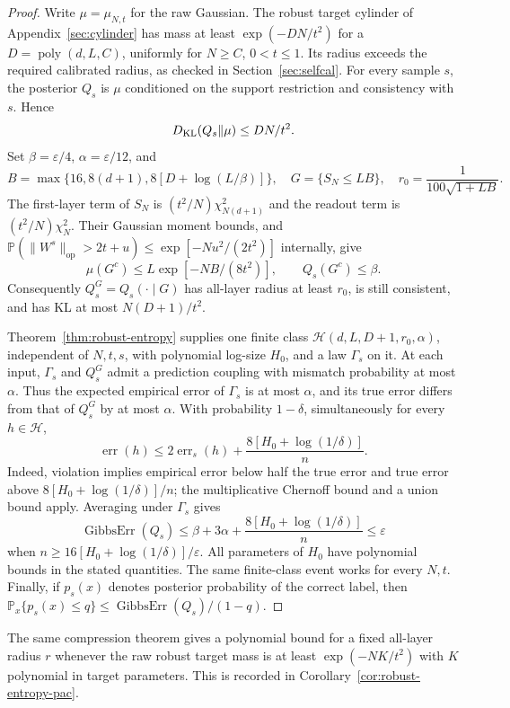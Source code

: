 \documentclass[11pt]{article}
\newcommand{\Pp}{\mathbb P}
\newcommand{\op}{\mathrm{op}}
\newcommand{\poly}{\operatorname{poly}}
\begin{document}
\begin{proof}
Write $\mu=\mu_{N,t}$ for the raw Gaussian. The robust target cylinder of
Appendix~\ref{sec:cylinder} has mass at least $\exp(-DN/t^2)$ for a
$D=\poly(d,L,C)$, uniformly for $N\ge C$, $0<t\le1$. Its radius exceeds
the required calibrated radius, as checked in Section~\ref{sec:selfcal}.
For every sample $s$, the posterior $Q_s$ is $\mu$ conditioned on the support
restriction and consistency with $s$. Hence
\[
 D_{\rm KL}(Q_s\Vert\mu)\le DN/t^2.
\]
Set $\beta=\varepsilon/4$, $\alpha=\varepsilon/12$, and
\[
 B=\max\{16,8(d+1),8[D+\log(L/\beta)]\},\quad
 G=\{S_N\le LB\},\quad r_0=\frac{1}{100\sqrt{1+LB}}.
\]
The first-layer term of $S_N$ is $(t^2/N)\chi^2_{N(d+1)}$ and the readout
term is $(t^2/N)\chi^2_N$. Their Gaussian moment bounds, and
$\Pp(\|W^s\|_{\op}>2t+u)\le\exp[-Nu^2/(2t^2)]$ internally, give
\[
 \mu(G^c)\le L\exp[-NB/(8t^2)],\qquad Q_s(G^c)\le\beta.
\]
Consequently $Q_s^G=Q_s(\cdot\mid G)$ has all-layer radius at least $r_0$,
is still consistent, and has KL at most $N(D+1)/t^2$.

Theorem~\ref{thm:robust-entropy} supplies one finite class
$\mathcal H(d,L,D+1,r_0,\alpha)$, independent of $N,t,s$, with polynomial
log-size $H_0$, and a law $\Gamma_s$ on it. At each input, $\Gamma_s$ and
$Q_s^G$ admit a prediction coupling with mismatch probability at most
$\alpha$. Thus the expected empirical error of $\Gamma_s$ is at most
$\alpha$, and its true error differs from that of $Q_s^G$ by at most $\alpha$.
With probability $1-\delta$, simultaneously for every $h\in\mathcal H$,
\[
 \operatorname{err}(h)\le2\operatorname{err}_s(h)
            +\frac{8[H_0+\log(1/\delta)]}{n}.
\]
Indeed, violation implies empirical error below half the true error and
true error above $8[H_0+\log(1/\delta)]/n$; the multiplicative Chernoff
bound and a union bound apply. Averaging under $\Gamma_s$ gives
\[
 \operatorname{GibbsErr}(Q_s)
 \le\beta+3\alpha+\frac{8[H_0+\log(1/\delta)]}{n}\le\varepsilon
\]
when $n\ge16[H_0+\log(1/\delta)]/\varepsilon$. All parameters of $H_0$
have polynomial bounds in the stated quantities. The same finite-class event
works for every $N,t$. Finally, if $p_s(x)$ denotes posterior probability of
the correct label, then
$\Pp_x\{p_s(x)\le q\}\le\operatorname{GibbsErr}(Q_s)/(1-q)$.
\end{proof}

The same compression theorem gives a polynomial bound for a fixed all-layer
radius $r$ whenever the raw robust target mass is at least $\exp(-NK/t^2)$
with $K$ polynomial in target parameters. This is recorded in
Corollary~\ref{cor:robust-entropy-pac}.
\end{document}
